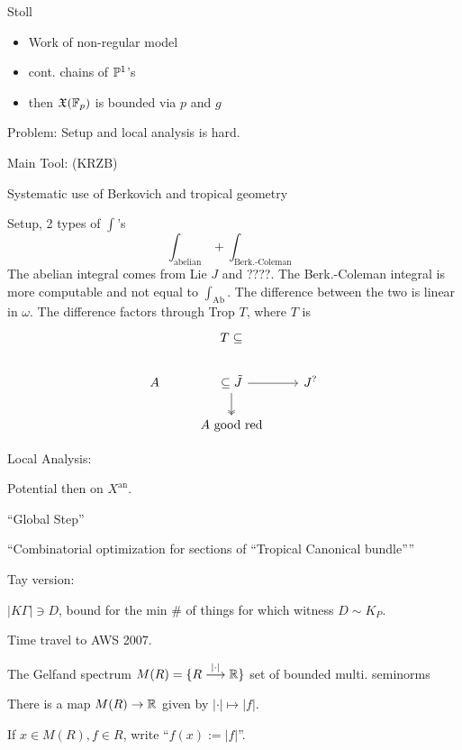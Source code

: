Stoll

\begin{itemize}
\item Work of non-regular model
\item cont. chains of $\P^1$'s
\item then $\fX(\F_p)$ is bounded via $p$ and $g$
\end{itemize}


Problem: Setup and local analysis is hard.


Main Tool: (KRZB)

Systematic use of Berkovich and tropical geometry

Setup, 2 types of $\int$'s
	\[
	\int_{\text{abelian}} + \int_{\text{Berk.-Coleman}}
	\]
The abelian integral comes from Lie $J$ and ????. The Berk.-Coleman integral is more computable and not equal to $\int_{\text{Ab}}$. The difference between the two is linear in $\omega$. The difference factors through Trop $T$, where $T$ is 
	\[
	\begin{tikzcd}
	& T \subseteq & \\
	A & \subseteq \tilde{J} \arrow[two heads]{d} \arrow{r} & J^? \\
	& A \text{ good red}
	\end{tikzcd}
	\]

Local Analysis:

Potential then on $X^\text{an}$.


``Global Step''

``Combinatorial optimization for sections of ``Tropical Canonical bundle''''

Tay version:

$|K \Gamma| \ni D$, bound for the min \# of things for which witness $D \sim K_P$.


Time travel to AWS 2007.

The Gelfand spectrum
$M(R)= \{ R \ma{|\cdot|} \R\}$ set of bounded multi. seminorms 

There is a map $M(R) \to \R$ given by $|\cdot| \mapsto |f|$. 

If $x \in M(R), f \in R$, write ``$f(x):= |f|$''. 


